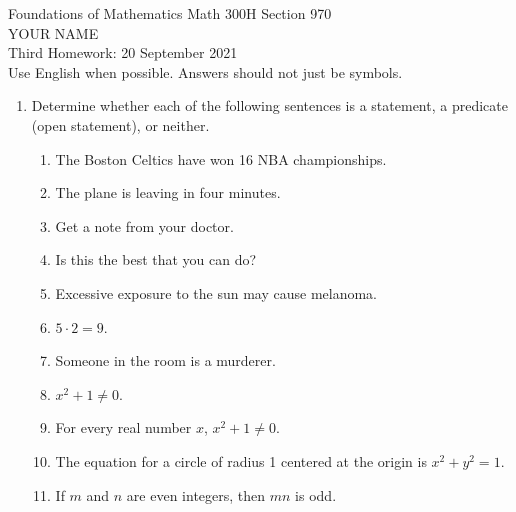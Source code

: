 \documentclass[12pt]{article}
\begin{document}
\LARGE 
\noindent
{\color{Maroon}Foundations of Mathematics \hfill Math 300H Section 970}\vspace{2pt}\\
\Large YOUR NAME\vspace{2pt}\\
\large
Third Homework: \hfill 20 September 2021\\
Use English when possible.  Answers should not just be symbols.
\normalsize\vspace{10pt}


\begin{enumerate}  %


\item Determine whether each of the following sentences is a statement, a predicate (open
  statement), or neither.\vspace{-8pt}
 \begin{enumerate}
  \item The Boston Celtics have won 16 NBA championships.\vspace{-2pt}
  \item The plane is leaving in four minutes.\vspace{-2pt}
  \item Get a note from your doctor.\vspace{-2pt}
  \item Is this the best that you can do?\vspace{-2pt}
  \item Excessive exposure to the sun may cause melanoma.\vspace{-2pt}
  \item $5\cdot 2=9$.\vspace{-2pt}
  \item Someone in the room is a murderer.\vspace{-2pt}
  \item $x^2+1\neq 0$.\vspace{-2pt}
  \item For every real number $x$, $x^2+1\neq 0$.\vspace{-2pt}
  \item The equation for a circle of radius 1 centered at the origin is $x^2+y^2=1$.\vspace{-2pt}
  \item If $m$ and $n$ are even integers, then $mn$ is odd.\vspace{-2pt}
 \end{enumerate}


\end{enumerate}
\end{document}
